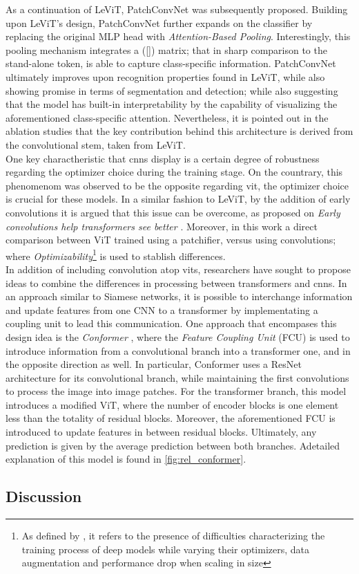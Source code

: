 As a continuation of LeViT, PatchConvNet \autocite{touvron2021augmenting} was subsequently 
proposed. Building upon LeViT's design, PatchConvNet further expands on the classifier by 
replacing the original MLP head with \emph{Attention-Based Pooling}. Interestingly, this 
pooling mechanism integrates a ([]) matrix; that in sharp comparison to the stand-alone 
token, is able to capture class-specific information. PatchConvNet ultimately improves upon 
recognition properties found in LeViT, while also showing promise in terms of segmentation and 
detection; while also suggesting that the model has built-in interpretability by the capability of 
visualizing the aforementioned class-specific attention. Nevertheless, it is pointed out in the 
ablation studies that the key contribution behind this architecture is derived from the 
convolutional stem, taken from LeViT.\\ 

\noindent One key charactheristic that \glspl{cnn} display is a certain degree of robustness 
regarding the optimizer choice during the training stage. On the countrary, this phenomenom was 
observed to be the opposite regarding \gls{vit}, the optimizer choice is crucial for these 
models. In a similar fashion to LeViT, by the addition of early convolutions it is argued that 
this issue can be overcome, as proposed on \emph{Early convolutions help transformers see 
better} \autocite{xiao2021early}. Moreover, in this work a direct comparison between ViT trained 
using a patchifier, versus using convolutions; where \emph{Optimizability}\footnote{As defined by 
\cite{xiao2021early}, it refers to the presence of difficulties characterizing the training 
process of deep models while varying their optimizers, data augmentation and performance drop 
when scaling in size} is used to stablish differences.\\



\noindent In addition of including convolution atop \glspl{vit}, researchers have sought to propose 
ideas to combine the differences in processing between transformers and \glspl{cnn}. In an 
approach similar to Siamese networks, it is possible to interchange information and update 
features from one CNN to a transformer by implementating a coupling unit to lead this 
communication. One approach that encompases this design idea is the \emph{Conformer} \autocite{
peng2021conformer}, where the \emph{Feature Coupling Unit} (FCU) is used to introduce information 
from a convolutional branch into a transformer one, and in the opposite direction as well. In 
particular, Conformer uses a ResNet architecture for its convolutional branch, while 
maintaining the first convolutions to process the image into image patches. For the transformer 
branch, this model introduces a modified ViT, where the number of encoder blocks is one element 
less than the totality of residual blocks. Moreover, the aforementioned FCU is introduced to update 
features in between residual blocks. Ultimately, any prediction is given by the average prediction 
between both branches. Adetailed explanation of this model is found in \autoref{fig:rel_conformer}.

\subsection{Discussion}
\label{{rel:discussion}}

